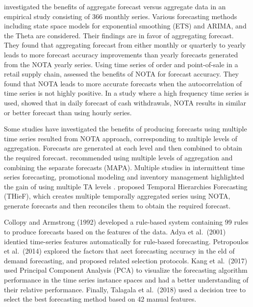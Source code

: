 \documentclass[]{elsarticle} %
\begin{document}
\citet{athanasopoulos2011tourism} investigated the benefits of aggregate
forecast versus aggregate data in an empirical study consisting of 366
monthly series. Various forecasting methods including state space models
for exponential smoothing (ETS) and ARIMA, and the Theta are considered.
Their findings are in favor of aggregating forecast. They found that
aggregating forecast from either monthly or quarterly to yearly leads to
more forecast accuracy improvements than yearly forecasts generated from
the NOTA yearly series. Using time series of order and point-of-sale in
a retail supply chain, \citet{jin2015forecasting} assessed the benefits
of NOTA for forecast accuracy. They found that NOTA leads to more
accurate forecasts when the autocorrelation of time series is not highly
positive. In a study where a high frequency time series is used,
\citet{luna2011top} showed that in daily forecast of cash withdrawals,
NOTA results in similar or better forecast than using hourly series.

Some studies have investigated the benefits of producing forecasts using
multiple time series resulted from NOTA approach, corresponding to
multiple levels of aggregation. Forecasts are generated at each level
and then combined to obtain the required forecast.
\citet{kourentzes2014improving} recommended using multiple levels of
aggregation and combining the separate forecasts (MAPA). Multiple
studies in intermittent time series forecasting, promotional modeling
and inventory management highlighted the gain of using multiple TA
levels
\citep[\citet{barrow2016distributions}]{petropoulos2014forecast, kourentzes2015forecasting}.
\citet{athanasopoulos2017forecasting} proposed Temporal Hierarchies
Forecasting (THieF), which creates multiple temporally aggregated series
using NOTA, generate forecasts and then reconciles them to obtain the
required forecast.

Collopy and Armstrong (1992) developed a rule-based system containing 99
rules to produce forecasts based on the features of the data. Adya et
al.~(2001) identied time-series features automatically for rule-based
forecasting. Petropoulos et al.~(2014) explored the factors that aect
forecasting accuracy in the eld of demand forecasting, and proposed
related selection protocols. Kang et al.~(2017) used Principal Component
Analysis (PCA) to visualize the forecasting algorithm performance in the
time series instance spaces and had a better understanding of their
relative performance. Finally, Talagala et al.~(2018) used a decision
tree to select the best forecasting method based on 42 manual features.
\end{document}
